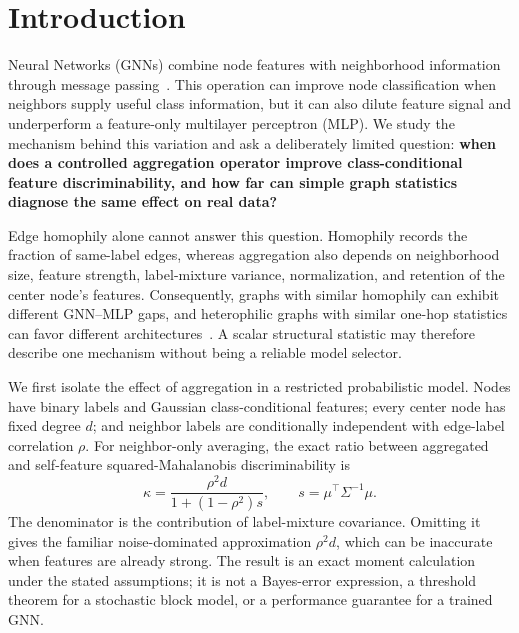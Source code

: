 
\section{Introduction}
\label{sec:intro}

 Neural Networks (GNNs) combine node features with neighborhood information through message passing~\cite{kipf2017gcn,velivckovic2018gat,hamilton2017graphsage}. This operation can improve node classification when neighbors supply useful class information, but it can also dilute feature signal and underperform a feature-only multilayer perceptron (MLP). We study the mechanism behind this variation and ask a deliberately limited question: \textbf{when does a controlled aggregation operator improve class-conditional feature discriminability, and how far can simple graph statistics diagnose the same effect on real data?}

Edge homophily alone cannot answer this question. Homophily records the fraction of same-label edges, whereas aggregation also depends on neighborhood size, feature strength, label-mixture variance, normalization, and retention of the center node's features. Consequently, graphs with similar homophily can exhibit different GNN--MLP gaps, and heterophilic graphs with similar one-hop statistics can favor different architectures~\cite{zhu2020beyond}. A scalar structural statistic may therefore describe one mechanism without being a reliable model selector.

We first isolate the effect of aggregation in a restricted probabilistic model. Nodes have binary labels and Gaussian class-conditional features; every center node has fixed degree $d$; and neighbor labels are conditionally independent with edge-label correlation $\rho$. For neighbor-only averaging, the exact ratio between aggregated and self-feature squared-Mahalanobis discriminability is
\begin{equation}
    \kappa=\frac{\rho^2d}{1+(1-\rho^2)s},
    \qquad s=\mu^\top\Sigma^{-1}\mu.
\end{equation}
The denominator is the contribution of label-mixture covariance. Omitting it gives the familiar noise-dominated approximation $\rho^2d$, which can be inaccurate when features are already strong. The result is an exact moment calculation under the stated assumptions; it is not a Bayes-error expression, a threshold theorem for a stochastic block model, or a performance guarantee for a trained GNN.
\IEEEpubidadjcol


